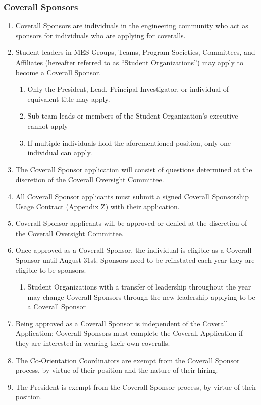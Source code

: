 \subsubsection{Coverall Sponsors}
\label{coverall-sponsors}

\begin{enumerate}
 \item
  Coverall Sponsors are individuals in the engineering community who act
  as sponsors for individuals who are applying for coveralls.
 \item
  Student leaders in MES Groups, Teams, Program Societies, Committees,
  and Affiliates (hereafter referred to as ``Student Organizations'')
  may apply to become a Coverall Sponsor.

  \begin{enumerate}
   \item
    Only the President, Lead, Principal Investigator, or individual of
    equivalent title may apply.
   \item
    Sub-team leads or members of the Student Organization's executive
    cannot apply
   \item
    If multiple individuals hold the aforementioned position, only one
    individual can apply.
  \end{enumerate}
 \item
  The Coverall Sponsor application will consist of questions determined
  at the discretion of the Coverall Oversight Committee.
 \item
  All Coverall Sponsor applicants must submit a signed Coverall
  Sponsorship Usage Contract (Appendix Z) with their application.
 \item
  Coverall Sponsor applicants will be approved or denied at the
  discretion of the Coverall Oversight Committee.
 \item
  Once approved as a Coverall Sponsor, the individual is eligible as a
  Coverall Sponsor until August 31st. Sponsors need to be reinstated
  each year they are eligible to be sponsors.
  \begin{enumerate}
   \item
    Student Organizations with a transfer of leadership throughout the
    year may change Coverall Sponsors through the new leadership
    applying to be a Coverall Sponsor
  \end{enumerate}
 \item
  Being approved as a Coverall Sponsor is independent of the Coverall
  Application; Coverall Sponsors must complete the Coverall Application
  if they are interested in wearing their own coveralls.
 \item
  The Co-Orientation Coordinators are exempt from the Coverall Sponsor
  process, by virtue of their position and the nature of their hiring.
 \item
  The President is exempt from the Coverall Sponsor process, by virtue
  of their position.

\end{enumerate}

